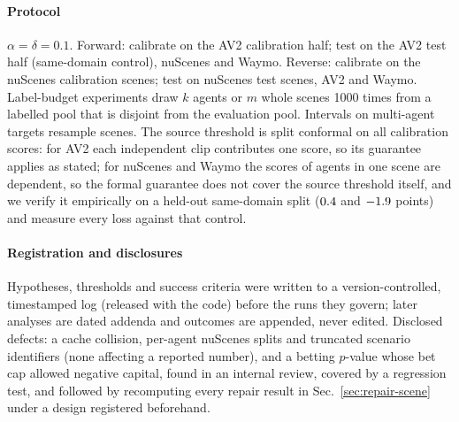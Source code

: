 \paragraph{Protocol} $\alpha=\delta=0.1$. Forward: calibrate on the AV2 calibration half; test on the AV2 test half
(same-domain control), nuScenes and Waymo. Reverse: calibrate on the nuScenes calibration scenes; test on nuScenes test
scenes, AV2 and Waymo. Label-budget experiments draw $k$ agents or $m$ whole scenes 1000 times from a labelled pool that
is disjoint from the evaluation pool. Intervals on multi-agent targets resample scenes. The source threshold is split conformal on all calibration scores: for AV2 each
independent clip contributes one score, so its guarantee applies as stated; for nuScenes and Waymo the scores of agents in one
scene are dependent, so the formal guarantee does not cover the source threshold itself, and we verify it empirically on a
held-out same-domain split ($0.4$ and $-1.9$ points) and measure every loss against that control.
\paragraph{Registration and disclosures} Hypotheses, thresholds and success criteria were written to a version-controlled,
timestamped log (released with the code) before the runs they govern; later analyses are dated addenda and outcomes are
appended, never edited. Disclosed defects: a cache collision, per-agent nuScenes splits and truncated scenario
identifiers (none affecting a reported number), and a betting $p$-value whose bet cap allowed negative capital, found in
an internal review, covered by a regression test, and followed by recomputing every repair result in
Sec.~\ref{sec:repair-scene} under a design registered beforehand.
